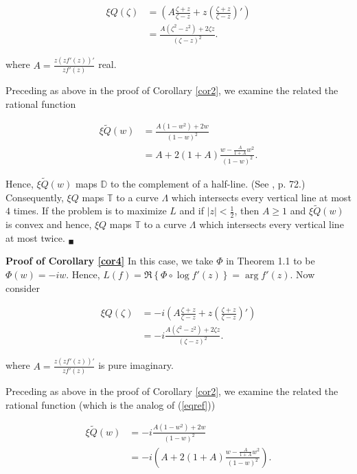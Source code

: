 \documentclass[final]{siamltex}
\newcommand{\dsp}{\displaystyle}
\newcommand{\T}{\mathbb{T}}
\newcommand{\D}{\mathbb{D}}
\begin{document}
\begin{align*}
\xi Q(\zeta) &= (A \frac{\zeta +z}{\zeta-z} + z\left( \frac{\zeta +z}{\zeta-z} \right ) ' )\\
&= \frac{ A (\zeta^2 - z^2 ) + 2 \zeta z }{(\zeta - z)^2}.
\end{align*}

\noindent where ${\dsp A = \frac{z (zf'(z))'}{zf'(z)}}$ real.

Preceding as above in the proof of Corollary \ref{cor2}, we examine the related the rational function 

\begin{align*}
\xi \tilde{Q}(w) &= \frac{A (1 - w^2) + 2w }{(1-w)^2} \\
                 &= A +  2(1+A)\frac{w - \frac{A}{1+A}w^2}{(1-w)^2} .
\end{align*}

Hence, $\xi \tilde{Q}(w)$ maps $\D$ to the complement of a half-line. (See \cite{d83}, p. 72.) Consequently, $\xi Q$ maps $\T$ to a curve $\Lambda$ which intersects every vertical line at most $4$ times.  If the problem is to maximize $L$ and if $|z| < \frac{1}{2}$, then $A \ge 1$ and $\xi \tilde{Q}(w)$ is convex and hence, $\xi Q$ maps $\T$ to a curve $\Lambda$ which intersects every vertical line at most twice. $_\blacksquare$


\vspace{0.1in}   

\noindent \textbf{Proof of Corollary \ref{cor4}}  In this case, we take $\Phi$ in Theorem 1.1 to be $\Phi (w) = -i w$.  Hence, $L(f) =  \Re \left\{ \Phi \circ \log f'(z) \right\} = \arg f'(z)$.  Now consider

\begin{align*}
\xi Q(\zeta) &= -i(A \frac{\zeta +z}{\zeta-z} + z\left( \frac{\zeta +z}{\zeta-z} \right ) ' )\\
&=-i \frac{ A (\zeta^2 - z^2 ) + 2 \zeta z }{(\zeta - z)^2}.
\end{align*}

\noindent where ${\dsp A = \frac{z (zf'(z))'}{zf'(z)}}$ is pure imaginary.

Preceding as above in the proof of Corollary \ref{cor2}, we examine the related the rational function (which is the analog of (\ref{eqref}))

\begin{align*}
\xi \tilde{Q}(w) &= -i \frac{A (1 - w^2) + 2w }{(1-w)^2} \\
                 &= -i \left (  A +  2(1+A)\frac{w - \frac{A}{1+A}w^2}{(1-w)^2} \right ).
\end{align*}
\end{document}

